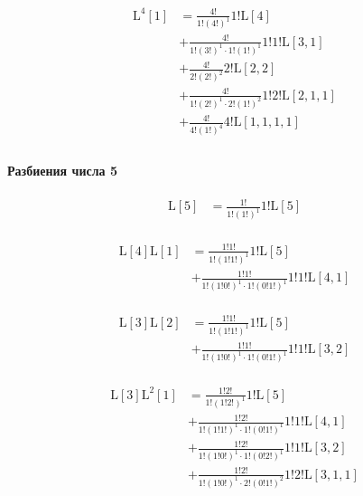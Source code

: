 \begin{equation*} \begin{aligned}
  \mathrm{L}^4[1] &=
  \frac{4!}{1!(4!)^1}
  1! \mathrm{L}[4] \\ &
+ \frac{4!}{1!(3!)^1 \cdot 1!(1!)^1}
  1!1! \mathrm{L}[3, 1] \\ &
+ \frac{4!}{2!(2!)^2}
  2! \mathrm{L}[2, 2] \\ &
+ \frac{4!}{1!(2!)^1 \cdot 2!(1!)^2}
  1!2! \mathrm{L}[2, 1, 1] \\ &
+ \frac{4!}{4!(1!)^4}
  4! \mathrm{L}[1, 1, 1, 1] \\
\end{aligned} \end{equation*}

\paragraph{Разбиения числа 5}

\begin{equation*} \begin{aligned}
  \mathrm{L}[5] &=
  \frac{1!}{1!(1!)^1}
  1! \mathrm{L}[5] \\
\end{aligned} \end{equation*}

\begin{equation*} \begin{aligned}
  \mathrm{L}[4] \mathrm{L}[1] &=
  \frac{1!1!}{1!(1!1!)^1}
  1! \mathrm{L}[5] \\ &
+ \frac{1!1!}{1!(1!0!)^1 \cdot 1!(0!1!)^1}
  1!1! \mathrm{L}[4, 1] \\
\end{aligned} \end{equation*}

\begin{equation*} \begin{aligned}
  \mathrm{L}[3] \mathrm{L}[2] &=
  \frac{1!1!}{1!(1!1!)^1}
  1! \mathrm{L}[5] \\ &
+ \frac{1!1!}{1!(1!0!)^1 \cdot 1!(0!1!)^1}
  1!1! \mathrm{L}[3, 2] \\
\end{aligned} \end{equation*}

\begin{equation*} \begin{aligned}
  \mathrm{L}[3] \mathrm{L}^2[1] &=
  \frac{1!2!}{1!(1!2!)^1}
  1! \mathrm{L}[5] \\ &
+ \frac{1!2!}{1!(1!1!)^1 \cdot 1!(0!1!)^1}
  1!1! \mathrm{L}[4, 1] \\ &
+ \frac{1!2!}{1!(1!0!)^1 \cdot 1!(0!2!)^1}
  1!1! \mathrm{L}[3, 2] \\ &
+ \frac{1!2!}{1!(1!0!)^1 \cdot 2!(0!1!)^2}
  1!2! \mathrm{L}[3, 1, 1] \\
\end{aligned} \end{equation*}

